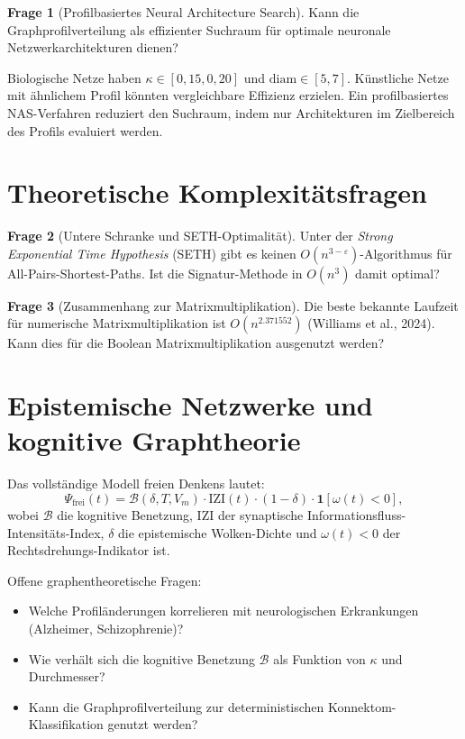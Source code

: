 ﻿\documentclass[a4paper,12pt,openany,oneside]{book}
\theoremstyle{definition}
\newtheorem{frage}{Frage}[chapter]
\theoremstyle{plain}
\theoremstyle{remark}
\begin{document}
\begin{frage}[Profilbasiertes Neural Architecture Search]
  Kann die Graphprofilverteilung als effizienter Suchraum f\"ur optimale
  neuronale Netzwerkarchitekturen dienen?
\end{frage}

Biologische Netze haben $\kappa \in [0{,}15, 0{,}20]$ und
$\mathrm{diam} \in [5,7]$. K\"unstliche Netze mit \"ahnlichem Profil
k\"onnten vergleichbare Effizienz erzielen. Ein profilbasiertes
NAS-Verfahren reduziert den Suchraum, indem nur Architekturen im
Zielbereich des Profils evaluiert werden.

\section{Theoretische Komplexit\"atsfragen}

\begin{frage}[Untere Schranke und SETH-Optimalit\"at]
  Unter der \emph{Strong Exponential Time Hypothesis} (SETH) gibt es
  keinen $O(n^{3-\varepsilon})$-Algorithmus f\"ur All-Pairs-Shortest-Paths.
  Ist die Signatur-Methode in $O(n^3)$ damit optimal?
\end{frage}

\begin{frage}[Zusammenhang zur Matrixmultiplikation]
  Die beste bekannte Laufzeit f\"ur numerische Matrixmultiplikation ist
  $O(n^{2.371552})$ (Williams et al., 2024). Kann dies f\"ur die Boolean
  Matrixmultiplikation ausgenutzt werden?
\end{frage}

\section{Epistemische Netzwerke und kognitive Graphtheorie}

Das vollst\"andige Modell freien Denkens lautet:
\[
  \Psi_{\mathrm{frei}}(t)
  = \mathcal{B}(\delta, T, V_m)
    \cdot \mathrm{IZI}(t)
    \cdot (1 - \delta)
    \cdot \mathbf{1}[\omega(t) < 0],
\]
wobei $\mathcal{B}$ die kognitive Benetzung, $\mathrm{IZI}$ der
synaptische Informationsfluss-Intensit\"ats-Index, $\delta$ die
epistemische Wolken-Dichte und $\omega(t) < 0$ der Rechtsdrehungs-Indikator ist.

Offene graphentheoretische Fragen:
\begin{itemize}
  \item Welche Profil\"anderungen korrelieren mit neurologischen
        Erkrankungen (Alzheimer, Schizophrenie)?
  \item Wie verh\"alt sich die kognitive Benetzung $\mathcal{B}$
        als Funktion von $\kappa$ und Durchmesser?
  \item Kann die Graphprofilverteilung zur deterministischen
        Konnektom-Klassifikation genutzt werden?
\end{itemize}
\end{document}

